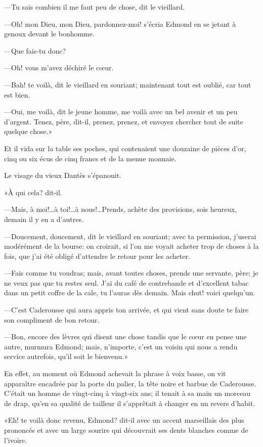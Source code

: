 —Tu sais combien il me faut peu de chose, dit le vieillard.

—Oh! mon Dieu, mon Dieu, pardonnez-moi! s'écria Edmond en se jetant à genoux devant le bonhomme.

—Que fais-tu donc?

—Oh! vous m'avez déchiré le cœur.

—Bah! te voilà, dit le vieillard en souriant; maintenant tout est oublié, car tout est bien.

—Oui, me voilà, dit le jeune homme, me voilà avec un bel avenir et un peu d'argent. Tenez, père, dit-il, prenez, prenez, et envoyez chercher tout de suite quelque chose.»

Et il vida sur la table ses poches, qui contenaient une douzaine de pièces d'or, cinq ou six écus de cinq francs et de la menue monnaie.

Le visage du vieux Dantès s'épanouit.

«À qui cela? dit-il.

—Mais, à moi!\dots à toi!\dots à nous!\dots Prends, achète des provisions, sois heureux, demain il y en a d'autres.

—Doucement, doucement, dit le vieillard en souriant; avec ta permission, j'userai modérément de la bourse: on croirait, si l'on me voyait acheter trop de choses à la fois, que j'ai été obligé d'attendre le retour pour les acheter.

—Fais comme tu voudras; mais, avant toutes choses, prends une servante, père; je ne veux pas que tu restes seul. J'ai du café de contrebande et d'excellent tabac dans un petit coffre de la cale, tu l'auras dès demain. Mais chut! voici quelqu'un.

—C'est Caderousse qui aura appris ton arrivée, et qui vient sans doute te faire son compliment de bon retour.

—Bon, encore des lèvres qui disent une chose tandis que le cœur en pense une autre, murmura Edmond; mais, n'importe, c'est un voisin qui nous a rendu service autrefois, qu'il soit le bienvenu.»

En effet, au moment où Edmond achevait la phrase à voix basse, on vit apparaître encadrée par la porte du palier, la tête noire et barbue de Caderousse. C'était un homme de vingt-cinq à vingt-six ans; il tenait à sa main un morceau de drap, qu'en sa qualité de tailleur il s'apprêtait à changer en un revers d'habit.

«Eh! te voilà donc revenu, Edmond? dit-il avec un accent marseillais des plus prononcés et avec un large sourire qui découvrait ses dents blanches comme de l'ivoire.

